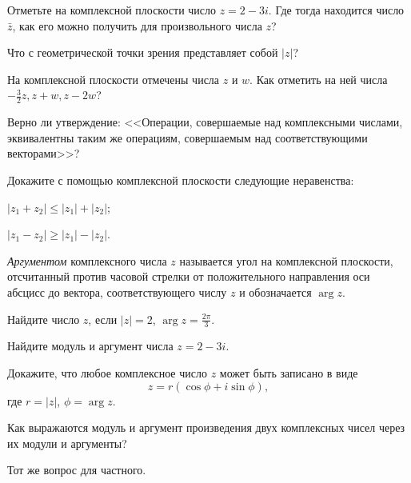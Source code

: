 \documentclass[a4paper, 12pt, num=21]{listok}
\begin{document}
\begin{problem}
\begin{probparts}
	\item Отметьте на комплексной плоскости число $z = 2 - 3i$. Где тогда находится число $\bar z$,
	как его можно получить для произвольного числа $z$?
	\item Что с геометрической точки зрения представляет собой $|z|$?
	\item На комплексной плоскости отмечены числа $z$ и $w$.
	Как отметить на ней числа $-\frac 32 z, z + w, z - 2w$?
\end{probparts}
\end{problem}
\begin{problem}
	Верно ли утверждение: <<Операции, совершаемые над комплексными числами, эквивалентны таким же операциям, совершаемым над соответствующими векторами>>?
\end{problem}
\begin{problem}
	Докажите с помощью комплексной плоскости следующие неравенства:
	\begin{multienum}{2}
		\item  $|z_1 + z_2| \le |z_1| + |z_2|$;
		\item  $|z_1 - z_2| \ge |z_1| - |z_2|$.
	\end{multienum}
\end{problem}
\begin{definition}
	\textit{Аргументом} комплексного числа $z$ называется угол на комплексной плоскости,
	отсчитанный против часовой стрелки от положительного направления оси абсцисс до вектора,
	соответствующего числу $z$ и обозначается $\arg z$.
\end{definition}
\begin{problem}
\begin{probparts}
	\item Найдите число $z$, если $|z| = 2$, $\arg z = \frac{2\pi}3$.
	\item Найдите модуль и аргумент числа $z = 2 - 3i$.
\end{probparts}
\end{problem}
\begin{problem}
	Докажите, что любое комплексное число $z$ может быть записано в виде
	\[
		z = r(\cos \phi + i \sin \phi),
	\]
	где $r = |z|$, $\phi = \arg z$.
\end{problem}
\begin{problem}
\begin{probparts}
	\item Как выражаются модуль и аргумент произведения двух комплексных чисел через их модули и аргументы?
	\item Тот же вопрос для частного.
\end{probparts}
\end{problem}
\end{document}
